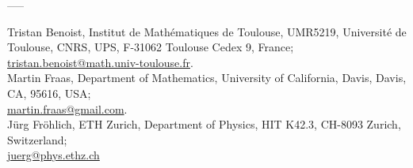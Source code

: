 \documentclass[11pt]{article}
\begin{document}
\begin{center}
-----
\end{center}


\bigskip


\noindent
Tristan Benoist, Institut de Math\'ematiques de Toulouse, UMR5219, Universit\'e de Toulouse, CNRS, UPS, F-31062 Toulouse Cedex 9, France;\\ \href{mailto:tristan.benoist@math.univ-toulouse.fr}{tristan.benoist@math.univ-toulouse.fr}.
\\[0.3em]
Martin Fraas, Department of Mathematics, University of California, Davis, Davis, CA, 95616, USA;\\ \href{mailto:martin.fraas@gmail.com}{martin.fraas@gmail.com}.
\\[0.3em]
J\"urg Fr\"ohlich, ETH Zurich, Department of Physics, HIT K42.3, CH-8093 Zurich, Switzerland;\\\href{mailto:juerg@phys.ethz.ch}{juerg@phys.ethz.ch}
\end{document}
